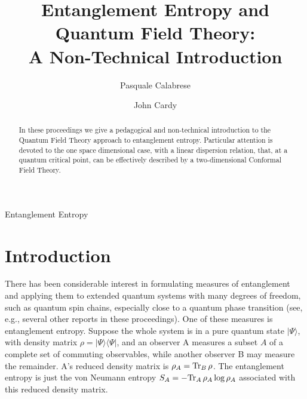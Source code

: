 \documentclass{ws-ijqi}
\begin{document}
{Entanglement Entropy}

\catchline{}{}{}{}{}

\title{Entanglement Entropy and Quantum Field Theory:\\ A Non-Technical Introduction}

\author{Pasquale Calabrese}
\address{Rudolf Peierls Centre for Theoretical Physics,
         1 Keble Road, Oxford OX1 3NP, UK\\
calabres@thphys.ox.ac.uk}

\author{John Cardy}
\address{Rudolf Peierls Centre for Theoretical Physics,
         1 Keble Road, Oxford OX1 3NP, UK and All Souls College, Oxford}  



\maketitle


\begin{abstract}
In these proceedings we give a pedagogical and non-technical 
introduction to the Quantum Field Theory approach to entanglement
entropy.
Particular attention is devoted to the one space dimensional 
case, with a linear dispersion relation, that, at a quantum critical
point, can be effectively described by a two-dimensional Conformal 
Field Theory. 
\end{abstract}


\section{Introduction}

There has been considerable interest in formulating measures of
entanglement and applying them to extended quantum systems with
many degrees of freedom, such as quantum spin chains, especially close to 
a quantum phase transition (see, e.g., several other reports in these 
proceedings). 
One of these measures is entanglement entropy.\cite{Bennett} 
Suppose the whole system is in a pure quantum state $|\Psi\rangle$, with 
density matrix $\rho=|\Psi\rangle\langle\Psi|$, and an observer A measures 
a subset $A$ of a complete set of commuting observables, while another
observer B may measure the remainder. A's reduced density matrix is
$\rho_A={\rm Tr}_B\,\rho$. The entanglement entropy is just the von
Neumann entropy $S_A=-{\rm Tr}_A\,\rho_A\log\rho_A$ associated with this
reduced density matrix.
\end{document}
